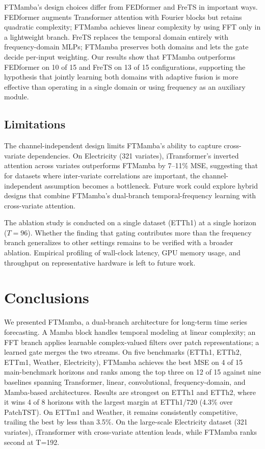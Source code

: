 \documentclass[electronics,article,submit,pdftex,moreauthors]{Definitions/mdpi}
\begin{document}
FTMamba's design choices differ from FEDformer and FreTS in important ways. FEDformer augments Transformer attention with Fourier blocks but retains quadratic complexity; FTMamba achieves linear complexity by using FFT only in a lightweight branch. FreTS replaces the temporal domain entirely with frequency-domain MLPs; FTMamba preserves both domains and lets the gate decide per-input weighting. Our results show that FTMamba outperforms FEDformer on 10 of 15 and FreTS on 13 of 15 configurations, supporting the hypothesis that jointly learning both domains with adaptive fusion is more effective than operating in a single domain or using frequency as an auxiliary module.

\subsection{Limitations}\label{sec:limitations}

The channel-independent design limits FTMamba's ability to capture cross-variate dependencies. On Electricity (321 variates), iTransformer's inverted attention across variates outperforms FTMamba by 7--11\% MSE, suggesting that for datasets where inter-variate correlations are important, the channel-independent assumption becomes a bottleneck. Future work could explore hybrid designs that combine FTMamba's dual-branch temporal-frequency learning with cross-variate attention.

The ablation study is conducted on a single dataset (ETTh1) at a single horizon ($T=96$). Whether the finding that gating contributes more than the frequency branch generalizes to other settings remains to be verified with a broader ablation. Empirical profiling of wall-clock latency, GPU memory usage, and throughput on representative hardware is left to future work.

\section{Conclusions}

We presented FTMamba, a dual-branch architecture for long-term time series forecasting. A Mamba block handles temporal modeling at linear complexity; an FFT branch applies learnable complex-valued filters over patch representations; a learned gate merges the two streams. On five benchmarks (ETTh1, ETTh2, ETTm1, Weather, Electricity), FTMamba achieves the best MSE on 4 of 15 main-benchmark horizons and ranks among the top three on 12 of 15 against nine baselines spanning Transformer, linear, convolutional, frequency-domain, and Mamba-based architectures. Results are strongest on ETTh1 and ETTh2, where it wins 4 of 8 horizons with the largest margin at ETTh1/720 (4.3\% over PatchTST). On ETTm1 and Weather, it remains consistently competitive, trailing the best by less than 3.5\%. On the large-scale Electricity dataset (321 variates), iTransformer with cross-variate attention leads, while FTMamba ranks second at T=192.
\end{document}
